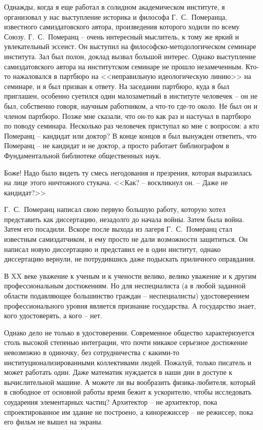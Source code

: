 \documentclass{book}
\begin{document}
Однажды, когда я еще работал в солидном академическом институте, я организовал у нас выступление историка и философа Г.~С.~Померанца, известного самиздатовского автора, произведения которого ходили по всему Союзу. Г.~С.~Померанц -- очень интересный мыслитель, к тому же яркий и увлекательный эссеист. Он выступил на философско-методологическом семинаре института. Зал был полон, доклад вызвал большой интерес. Однако выступление самиздатовского автора на институтском семинаре не прошло незамеченным. Кто-то нажаловался в партбюро на <<неправильную идеологическую линию>> на семинаре, и я был призван к ответу. На заседании партбюро, куда я был приглашен, особенно суетился один малозаметный в институте человечек -- он не был, собственно говоря, научным работником, а что-то где-то около. Не был он и членом партбюро. Позже мне сказали, что он-то как раз и настучал в партбюро по поводу семинара. Несколько раз человечек приступал ко мне с вопросом: а кто Померанц -- кандидат или доктор? В конце концов я был вынужден 
ответить,  что Померанц -- не кандидат и не доктор, а просто работает библиографом в Фундаментальной библиотеке общественных наук.

Боже! Надо было видеть ту смесь негодования и презрения, которая выразилась на лице этого ничтожного стукача. <<Как? -- воскликнул он. -- Даже не кандидат?>>

Г.~С.~Померанц написал свою первую большую работу, которую хотел представить как диссертацию, незадолго до начала войны. Затем была война. Затем его посадили. Вскоре после выхода из лагеря Г.~С.~Померанц стал известным самиздатчиком, и ему просто не дали возможности защититься. Он написал новую диссертацию и представил ее в один институт, однако диссертацию вернули, не потрудившись даже подыскать приличного оправдания.

В XX веке уважение к ученым и к учености велико, велико уважение и к другим профессиональным достижениям. Но для неспециалиста (а в любой заданной области подавляющее большинство граждан -- неспециалисты) удостоверением профессионального уровня является признание государства. А государство знает, кого удостоверять, а кого -- нет.

Однако дело не только в удостоверении. Современное общество характеризуется столь высокой степенью интеграции, что почти никакое серьезное достижение невозможно в одиночку, без сотрудничества с какими-то институционализированными коллективами людей. Пожалуй, только писатель и может работать один. Даже математик нуждается в наши дни в доступе к вычислительной машине. А можете ли вы вообразить физика-любителя, который в свободное от основной работы время бежит к ускорителю, чтобы исследовать соударения элементарных частиц? Архитектор -- не архитектор, пока спроектированное им здание не построено, а кинорежиссер -- не режиссер, пока его фильм не вышел на экраны.
\end{document}

